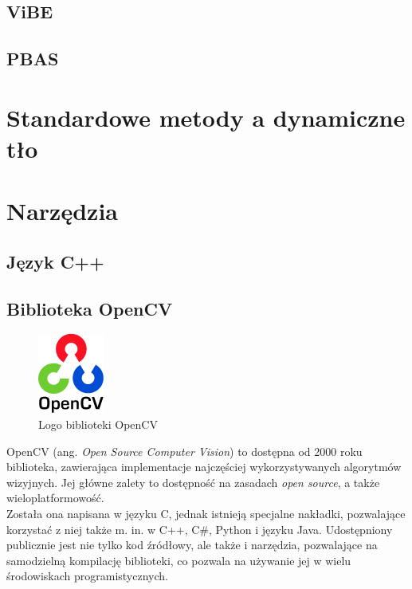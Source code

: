 \subsection{ViBE}
\cite{barnich2011vibe}
\subsection{PBAS}
\cite{hofmann2012background}
\section{Standardowe metody a dynamiczne tło}
\section{Narzędzia}
\subsection{Język C++}
\subsection{Biblioteka OpenCV}
\begin{figure}[!htb]
\centering

\includegraphics[width=82px]{img/ocv_logo}
\caption{Logo biblioteki OpenCV \cite{OpenCVLogo}}
\end{figure}
OpenCV (ang. \textit{Open Source Computer Vision}) to dostępna od 2000 roku biblioteka, zawierająca implementacje najczęściej wykorzystywanych algorytmów wizyjnych. Jej główne zalety to dostępność na zasadach \textit{open source}, a także wieloplatformowość.\\
Została ona napisana w języku C, jednak istnieją specjalne nakładki, pozwalające korzystać z niej także m. in. w C++, C\#, Python i języku Java. Udostępniony publicznie jest nie tylko kod źródłowy, ale także i narzędzia, pozwalające na samodzielną kompilację biblioteki, co pozwala na używanie jej w wielu środowiskach programistycznych.
